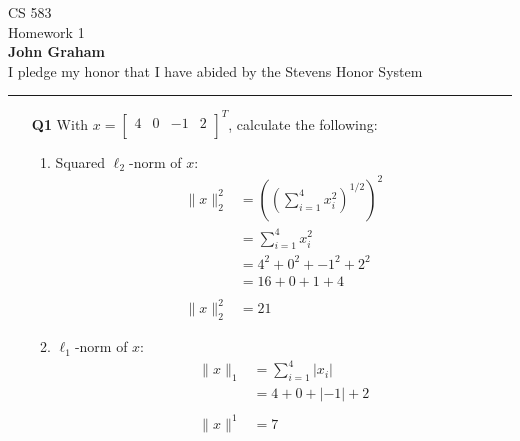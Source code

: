 \documentclass[letterpaper,12pt]{article}
\begin{document}
\begin{center}   
\begin{framed}  
CS 583 \\[2mm]  Homework 1\\[2mm]
\textbf{John Graham} \\[2mm] I pledge my honor that I have abided by the Stevens Honor System
\end{framed}
\end{center}

\vspace{5mm}
\hrule
\vspace{2mm}



\begin{itemize}

    \item[\textbf{Q1}] With $x = \begin{bmatrix}
                                    4 & 0 & -1 & 2 \\
                                    \end{bmatrix}^{T}$, calculate the following:
    
        \begin{enumerate}
            \item Squared $\ell_{2}$-norm of $x$: \\
                \[ \begin{split}
                    \|x\|^{2}_{2} & = ((\sum_{i = 1}^{4} x_{i}^{2})^{1/2})^{2} \\
                    & = \sum_{i = 1}^{4} x_{i}^{2} \\
                    & = 4^2 + 0^2 + -1^2 + 2^2 \\
                    & = 16 + 0 + 1 + 4 \\
                    & \\
                    \|x\|^{2}_{2} & = 21
                   \end{split}
                \]
            
            \item $\ell_{1}$-norm of $x$: \\
                \[ \begin{split}
                    \|x\|_{1} & = \sum_{i = 1}^{4} |x_{i}| \\
                    & = 4 + 0 + |-1| + 2 \\
                    & \\
                    \|x\|^{1} & = 7
                   \end{split}
                \]


\end{enumerate}
\end{itemize}
\end{document}
